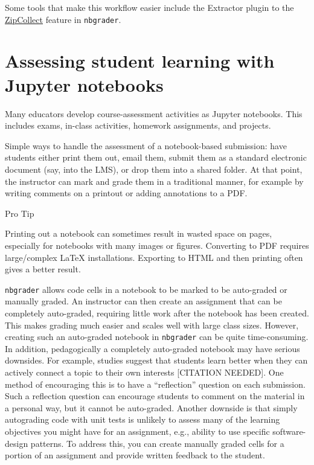 \documentclass[]{book}
\let\BeginKnitrBlock\begin \let\EndKnitrBlock\end
\begin{document}
Some tools that make this workflow easier include the Extractor plugin
to the
\href{https://nbgrader.readthedocs.io/en/stable/plugins/zipcollect-plugin.html}{ZipCollect}
feature in \texttt{nbgrader}.

\section{Assessing student learning with Jupyter
notebooks}\label{assessing-student-learning-with-jupyter-notebooks}

Many educators develop course-assessment activities as Jupyter
notebooks. This includes exams, in-class activities, homework
assignments, and projects.

Simple ways to handle the assessment of a notebook-based submission:
have students either print them out, email them, submit them as a
standard electronic document (say, into the LMS), or drop them into a
shared folder. At that point, the instructor can mark and grade them in
a traditional manner, for example by writing comments on a printout or
adding annotations to a PDF.

\BeginKnitrBlock{rmdnote}
Pro Tip

Printing out a notebook can sometimes result in wasted space on pages,
especially for notebooks with many images or figures. Converting to PDF
requires large/complex LaTeX installations. Exporting to HTML and then
printing often gives a better result.
\EndKnitrBlock{rmdnote}

\texttt{nbgrader} allows code cells in a notebook to be marked to be
auto-graded or manually graded. An instructor can then create an
assignment that can be completely auto-graded, requiring little work
after the notebook has been created. This makes grading much easier and
scales well with large class sizes. However, creating such an
auto-graded notebook in \texttt{nbgrader} can be quite time-consuming.
In addition, pedagogically a completely auto-graded notebook may have
serious downsides. For example, studies suggest that students learn
better when they can actively connect a topic to their own interests
{[}CITATION NEEDED{]}. One method of encouraging this is to have a
``reflection'' question on each submission. Such a reflection question
can encourage students to comment on the material in a personal way, but
it cannot be auto-graded. Another downside is that simply autograding
code with unit tests is unlikely to assess many of the learning
objectives you might have for an assignment, e.g., ability to use
specific software-design patterns. To address this, you can create
manually graded cells for a portion of an assignment and provide written
feedback to the student.
\end{document}
